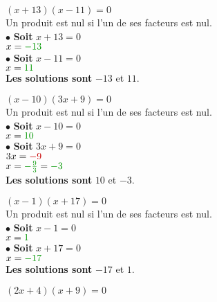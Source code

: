 \begin{pagesolutions}
    \begin{tcolorbox}[cartesolution={17}]
        $(x + 13)(x - 11) = 0$\\[0.5cm]
        Un produit est nul si l'un de ses facteurs est nul.\\[0.3cm]
        $\bullet$ \textbf{Soit} $x + 13 = 0$\\
        \phantom{$\bullet$ Soit} $x = \reduc{-13}$\\[0.3cm]
        $\bullet$ \textbf{Soit} $x - 11 = 0$\\
        \phantom{$\bullet$ Soit} $x = \reduc{11}$\\[0.5cm]
        \textbf{Les solutions sont} $-13$ et $11$.
    \end{tcolorbox}
    \begin{tcolorbox}[cartesolution={18}]
        $(x - 10)(3x + 9) = 0$\\[0.5cm]
        Un produit est nul si l'un de ses facteurs est nul.\\[0.3cm]
        $\bullet$ \textbf{Soit} $x - 10 = 0$\\
        \phantom{$\bullet$ Soit} $x = \reduc{10}$\\[0.3cm]
        $\bullet$ \textbf{Soit} $3x + 9 = 0$\\
        \phantom{$\bullet$ Soit} $3x = \modif{-9}$\\
        \phantom{$\bullet$ Soit} $x = \reduc{-\frac{9}{3}} = \reduc{-3}$\\[0.5cm]
        \textbf{Les solutions sont} $10$ et $-3$.
    \end{tcolorbox}
    \begin{tcolorbox}[cartesolution={19}]
        $(x - 1)(x + 17) = 0$\\[0.5cm]
        Un produit est nul si l'un de ses facteurs est nul.\\[0.3cm]
        $\bullet$ \textbf{Soit} $x - 1 = 0$\\
        \phantom{$\bullet$ Soit} $x = \reduc{1}$\\[0.3cm]
        $\bullet$ \textbf{Soit} $x + 17 = 0$\\
        \phantom{$\bullet$ Soit} $x = \reduc{-17}$\\[0.5cm]
        \textbf{Les solutions sont} $-17$ et $1$.
    \end{tcolorbox}
    \begin{tcolorbox}[cartesolution={20}]
        $(2x + 4)(x + 9) = 0$\\[0.5cm]

\end{tcolorbox}
\end{pagesolutions}

